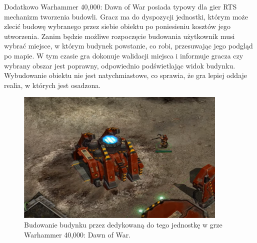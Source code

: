 Dodatkowo Warhammer 40,000: Dawn of War posiada typowy dla gier RTS mechanizm tworzenia budowli. Gracz ma
do dyspozycji jednostki, którym może zlecić budowę wybranego przez siebie obiektu po poniesieniu kosztów jego utworzenia.
Zanim będzie możliwe rozpoczęcie budowania użytkownik musi wybrać miejsce, w którym budynek powstanie, co robi, przesuwając
jego podgląd po mapie. W tym czasie gra dokonuje walidacji miejsca i informuje gracza czy wybrany obszar jest poprawny,
odpowiednio podświetlając widok budynku. Wybudowanie obiektu nie jest natychmiastowe, co sprawia, że gra lepiej oddaje
realia, w których jest osadzona.

\begin{figure}[h!]
    \centering
    \includegraphics[width=0.9\textwidth]{images/warhammer.jpg}
    \caption{Budowanie budynku przez dedykowaną do tego jednostkę w grze Warhammer 40,000: Dawn of War.}
\end{figure}